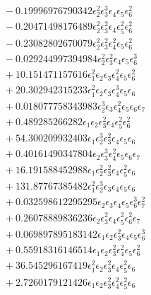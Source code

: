 \documentclass[10pt]{article}
\begin{document}
\begin{align*}
&{}  - 0.19996976790342 \epsilon_{2}^{2} \epsilon_{3}^{3} \epsilon_{4} \epsilon_{5} \epsilon_{6}^{2} \\
&{}  - 0.20471498176489 \epsilon_{2}^{2} \epsilon_{3}^{2} \epsilon_{4} \epsilon_{5}^{2} \epsilon_{6}^{2} \\
&{}  - 0.23082802670079 \epsilon_{2}^{2} \epsilon_{3}^{2} \epsilon_{4}^{2} \epsilon_{5} \epsilon_{6}^{2} \\
&{}  - 0.029244997394984 \epsilon_{2}^{2} \epsilon_{3}^{2} \epsilon_{4} \epsilon_{5} \epsilon_{6}^{3} \\
&{}  + 10.151471157616 \epsilon_{1}^{2} \epsilon_{2} \epsilon_{3} \epsilon_{4}^{2} \epsilon_{5} \epsilon_{6}^{2} \\
&{}  + 20.302942315233 \epsilon_{1}^{2} \epsilon_{2} \epsilon_{3} \epsilon_{4}^{3} \epsilon_{5} \epsilon_{6} \\
&{}  + 0.018077758343983 \epsilon_{2}^{3} \epsilon_{3} \epsilon_{4}^{2} \epsilon_{5} \epsilon_{6} \epsilon_{7} \\
&{}  + 0.489285266282 \epsilon_{1} \epsilon_{2} \epsilon_{3}^{2} \epsilon_{4} \epsilon_{5}^{2} \epsilon_{6}^{2} \\
&{}  + 54.300209932403 \epsilon_{1} \epsilon_{2}^{3} \epsilon_{3}^{2} \epsilon_{4} \epsilon_{5} \epsilon_{6} \\
&{}  + 0.40161490347804 \epsilon_{2} \epsilon_{3}^{3} \epsilon_{4}^{2} \epsilon_{5} \epsilon_{6} \epsilon_{7} \\
&{}  + 16.191588452988 \epsilon_{1} \epsilon_{2}^{2} \epsilon_{3}^{2} \epsilon_{4} \epsilon_{5}^{2} \epsilon_{6} \\
&{}  + 131.87767385482 \epsilon_{1}^{2} \epsilon_{2}^{3} \epsilon_{3} \epsilon_{4} \epsilon_{5} \epsilon_{6} \\
&{}  + 0.032598612295295 \epsilon_{2} \epsilon_{3} \epsilon_{4} \epsilon_{5} \epsilon_{6}^{3} \epsilon_{7}^{2} \\
&{}  + 0.26078889836236 \epsilon_{2} \epsilon_{3}^{2} \epsilon_{4} \epsilon_{5}^{2} \epsilon_{6}^{2} \epsilon_{7} \\
&{}  + 0.069897895183142 \epsilon_{1} \epsilon_{2} \epsilon_{3}^{2} \epsilon_{4} \epsilon_{5} \epsilon_{6}^{3} \\
&{}  + 0.55918316146514 \epsilon_{1} \epsilon_{2} \epsilon_{3}^{2} \epsilon_{4}^{2} \epsilon_{5} \epsilon_{6}^{2} \\
&{}  + 36.545296167419 \epsilon_{1}^{2} \epsilon_{2} \epsilon_{3}^{2} \epsilon_{4} \epsilon_{5}^{2} \epsilon_{6} \\
&{}  + 2.7260179121426 \epsilon_{1} \epsilon_{2} \epsilon_{3}^{2} \epsilon_{4}^{2} \epsilon_{5}^{2} \epsilon_{6} \\

\end{align*}
\end{document}
